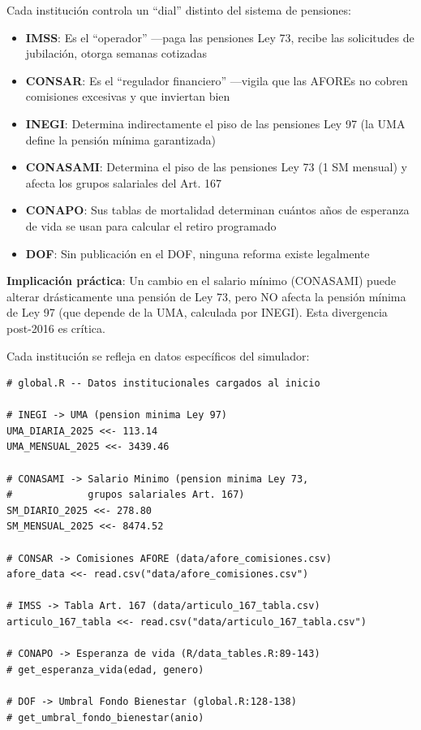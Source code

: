 \documentclass[11pt,a4paper]{report}
\begin{document}
\begin{tcolorbox}[colback=green!5!white, colframe=green!50!black, title=\textbf{Intuici\'on}]
Cada instituci\'on controla un ``dial'' distinto del sistema de pensiones:

\begin{itemize}[nosep]
\item \textbf{IMSS}: Es el ``operador'' ---paga las pensiones Ley 73, recibe las solicitudes de jubilaci\'on, otorga semanas cotizadas
\item \textbf{CONSAR}: Es el ``regulador financiero'' ---vigila que las AFOREs no cobren comisiones excesivas y que inviertan bien
\item \textbf{INEGI}: Determina indirectamente el piso de las pensiones Ley 97 (la UMA define la pensi\'on m\'inima garantizada)
\item \textbf{CONASAMI}: Determina el piso de las pensiones Ley 73 (1 SM mensual) y afecta los grupos salariales del Art. 167
\item \textbf{CONAPO}: Sus tablas de mortalidad determinan cu\'antos a\~nos de esperanza de vida se usan para calcular el retiro programado
\item \textbf{DOF}: Sin publicaci\'on en el DOF, ninguna reforma existe legalmente
\end{itemize}

\textbf{Implicaci\'on pr\'actica}: Un cambio en el salario m\'inimo (CONASAMI) puede alterar dr\'asticamente una pensi\'on de Ley 73, pero NO afecta la pensi\'on m\'inima de Ley 97 (que depende de la UMA, calculada por INEGI). Esta divergencia post-2016 es cr\'itica.
\end{tcolorbox}

\begin{tcolorbox}[colback=orange!5!white, colframe=orange!75!black, title=\textbf{Aplicaci\'on en C\'odigo}]
Cada instituci\'on se refleja en datos espec\'ificos del simulador:

\begin{lstlisting}
# global.R -- Datos institucionales cargados al inicio

# INEGI -> UMA (pension minima Ley 97)
UMA_DIARIA_2025 <<- 113.14
UMA_MENSUAL_2025 <<- 3439.46

# CONASAMI -> Salario Minimo (pension minima Ley 73,
#             grupos salariales Art. 167)
SM_DIARIO_2025 <<- 278.80
SM_MENSUAL_2025 <<- 8474.52

# CONSAR -> Comisiones AFORE (data/afore_comisiones.csv)
afore_data <<- read.csv("data/afore_comisiones.csv")

# IMSS -> Tabla Art. 167 (data/articulo_167_tabla.csv)
articulo_167_tabla <<- read.csv("data/articulo_167_tabla.csv")

# CONAPO -> Esperanza de vida (R/data_tables.R:89-143)
# get_esperanza_vida(edad, genero)

# DOF -> Umbral Fondo Bienestar (global.R:128-138)
# get_umbral_fondo_bienestar(anio)
\end{lstlisting}
\end{tcolorbox}
\end{document}
